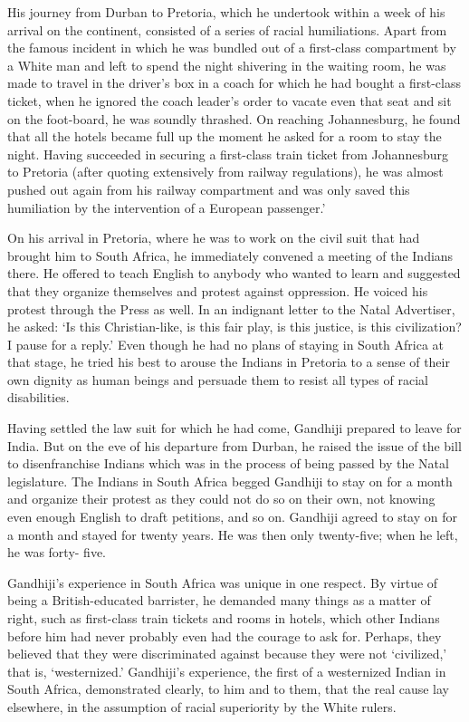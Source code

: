 \begin{multicols}{2}
His journey from Durban to Pretoria, which he undertook within a week of his arrival on the continent, consisted of a series of racial humiliations. Apart from the famous incident in which he was bundled out of a first-class compartment by a White man and left to spend the night shivering in the waiting room, he was made to travel in the driver's box in a coach for which he had bought a first-class ticket, when he ignored the coach leader's order to vacate even that seat and sit on the foot-board, he was soundly thrashed. On reaching Johannesburg, he found that all the hotels became full up the moment he asked for a room to stay the night. Having succeeded in securing a first-class train ticket from Johannesburg to Pretoria (after quoting extensively from railway regulations), he was almost pushed out again from his railway compartment and was only saved this humiliation by the intervention of a European passenger.'

On his arrival in Pretoria, where he was to work on the civil suit that had brought him to South Africa, he immediately convened a meeting of the Indians there. He offered to teach English to anybody who wanted to learn and suggested that they organize themselves and protest against oppression. He voiced his protest through the Press as well. In an indignant letter to the Natal Advertiser, he asked: `Is this Christian-like, is this fair play, is this justice, is this civilization? I pause for a reply.' Even though he had no plans of staying in South Africa at that stage, he tried his best to arouse the Indians in Pretoria to a sense of their own dignity as human beings and persuade them to resist all types of racial disabilities.

Having settled the law suit for which he had come, Gandhiji prepared to leave for India. But on the eve of his departure from Durban, he raised the issue of the bill to disenfranchise Indians which was in the process of being passed by the Natal legislature. The Indians in South Africa begged Gandhiji to stay on for a month and organize their protest as they could not do so on their own, not knowing even enough English to draft petitions, and so on. Gandhiji agreed to stay on for a month and stayed for twenty years. He was then only twenty-five; when he left, he was forty- five.

Gandhiji's experience in South Africa was unique in one respect. By virtue of being a British-educated barrister, he demanded many things as a matter of right, such as first-class train tickets and rooms in hotels, which other Indians before him had never probably even had the courage to ask for. Perhaps, they believed that they were discriminated against because they were not `civilized,' that is, `westernized.' Gandhiji's experience, the first of a westernized Indian in South Africa, demonstrated clearly, to him and to them, that the real cause lay elsewhere, in the assumption of racial superiority by the White rulers.


\end{multicols}
